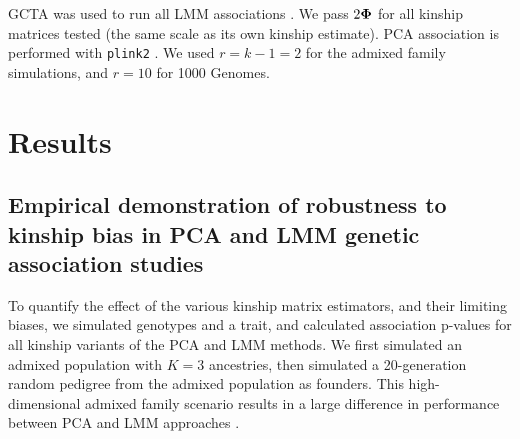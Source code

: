 \documentclass[11pt]{article}
\newcommand{\kinMat}{%
  \ensuremath{%
    \mathbf{\Phi}
  }%
  \xspace%
}%
\begin{document}
GCTA was used to run all LMM associations \citep{yang_gcta:_2011, yang_advantages_2014}. We pass $2 \kinMat$ for all kinship matrices tested (the same scale as its own kinship estimate).
PCA association is performed with \texttt{plink2} \citep{chang_second-generation_2015}.
We used $r=k-1=2$ for the admixed family simulations, and $r=10$ for 1000 Genomes.

\section{Results}

\subsection{Empirical demonstration of robustness to kinship bias in PCA and LMM genetic association studies}

To quantify the effect of the various kinship matrix estimators, and their limiting biases, we simulated genotypes and a trait, and calculated association p-values for all kinship variants of the PCA and LMM methods.
We first simulated an admixed population with $K=3$ ancestries, then simulated a 20-generation random pedigree from the admixed population as founders.
This high-dimensional admixed family scenario results in a large difference in performance between PCA and LMM approaches \citep{yao_limitations_2022}.

\graphicspath{ {../data/sim-admix-n1000-m100000-k3-f0.3-s0.5-mc100-h0.8-g20-fes/} }
\end{document}
